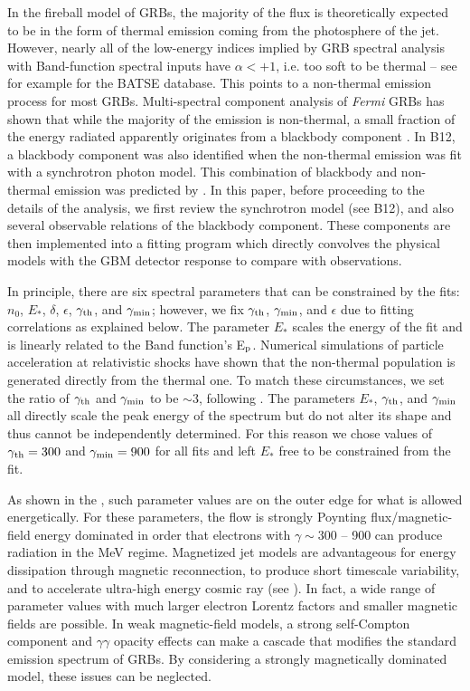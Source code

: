 In the fireball model of GRBs, the majority of the flux is
theoretically expected to be in the form of thermal emission coming
from the photosphere of the jet. However, nearly all of the low-energy
indices implied by GRB spectral analysis with Band-function spectral
inputs have $\alpha<+1$, i.e. too soft to be thermal -- see
  for example \cite{Goldstein:2012} for the BATSE database.
This points to a non-thermal emission process for most
GRBs. Multi-spectral component analysis of {\it Fermi} GRBs has shown
that while the majority of the emission is non-thermal, a small
fraction of the energy radiated apparently originates from a blackbody
component \cite{Guiriec:2010,Axelsson:2012}. In B12, a blackbody
component was also identified when the non-thermal emission was fit
with a synchrotron photon model. This combination of blackbody and
non-thermal emission was predicted by \cite{Meszaros:2000}.
In this paper, before proceeding to the details of the
  analysis, we first review the synchrotron model (see B12), and also
several observable relations of the blackbody component. These
components are then implemented into a fitting program which directly
convolves the physical models with the GBM detector response to
compare with observations.



In principle, there are six spectral parameters that can be
constrained by the fits: $n_0$, $E_{*}$, $\delta$, $\epsilon$,
$\gamma_{\rm th}$, and $\gamma_{\rm min}$; however, we fix $\gamma_{\rm th}$, $\gamma_{\rm min}$, and
$\epsilon$ due to fitting correlations as explained below. The
parameter $E_{*}$ scales the energy of the fit and is linearly related
to the Band function's E$_{\rm p}$. Numerical simulations of particle
acceleration at relativistic shocks have shown \cite{Baring:2004}
that the non-thermal population is generated directly from the thermal
one. To match these circumstances, we set the ratio of $\gamma_{\rm th}$ and
$\gamma_{\rm min}$ to be $\sim$3, following \cite{Baring:2004}.  The
parameters $E_*$, $\gamma_{\rm th}$, and $\gamma_{\rm min}$ all directly scale the
peak energy of the spectrum but do not alter its shape and thus cannot
be independently determined. For this reason we chose values of
$\gamma_{\rm th}=300$ and $\gamma_{\rm min}=900$ for all fits and left $E_*$ free to
be constrained from the fit.

As shown in the , such parameter values are on the outer edge
for what is allowed energetically.  For these parameters, the flow is
strongly Poynting flux/magnetic-field energy dominated in order that
electrons with $\gamma\sim 300$ -- 900 can produce radiation in the
MeV regime.  Magnetized jet models are advantageous for energy
dissipation through magnetic reconnection, to produce short timescale
variability, and to accelerate ultra-high energy cosmic ray (see
). In fact, a wide range of parameter values with much larger
electron Lorentz factors and smaller magnetic fields are possible. In
weak magnetic-field models, a strong self-Compton component and
$\gamma\gamma$ opacity effects can make a cascade that modifies the
standard emission spectrum of GRBs. By considering a strongly
magnetically dominated model, these issues can be neglected.

